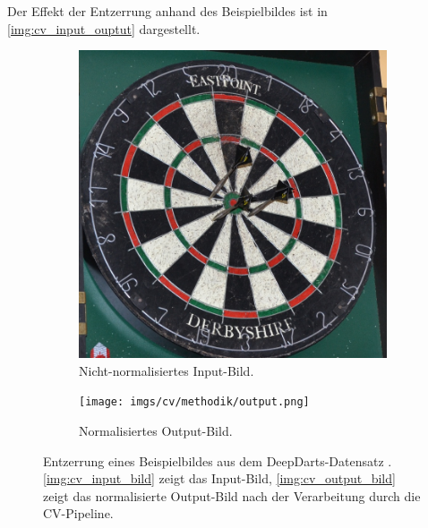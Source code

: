 Der Effekt der Entzerrung anhand des Beispielbildes ist in \autoref{img:cv_input_ouptut} dargestellt.


\begin{figure}
    \centering
    \begin{subfigure}{0.45\textwidth}
        \centering
        \includegraphics[width=\textwidth]{imgs/cv/methodik/input.jpg}
        \caption{Nicht-normalisiertes Input-Bild.}
        \label{img:cv_input_bild}
    \end{subfigure}
    \hfill
    \begin{subfigure}{0.45\textwidth}
        \centering\texttt{[image: imgs/cv/methodik/output.png]}
        \caption{Normalisiertes Output-Bild.}
        \label{img:cv_output_bild}
    \end{subfigure}
    \caption{Entzerrung eines Beispielbildes aus dem DeepDarts-Datensatz \cite{deepdarts-data}. \autoref{img:cv_input_bild} zeigt das Input-Bild, \autoref{img:cv_output_bild} zeigt das normalisierte Output-Bild nach der Verarbeitung durch die CV-Pipeline.}
    \label{img:cv_input_ouptut}
\end{figure}
